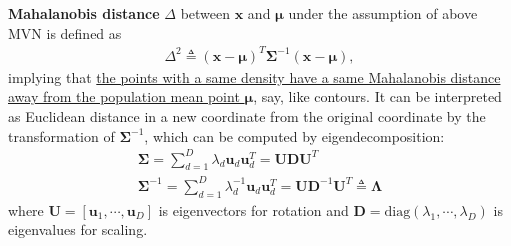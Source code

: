 \textbf{Mahalanobis distance} $\Delta$ between $\bm{x}$ and $\bm{\mu}$
under the assumption of above MVN is defined as
\begin{gather}
    \Delta^2\triangleq
    (\bm{x}-\bm{\mu})^T
    \bm{\Sigma}^{-1}
    (\bm{x}-\bm{\mu}),
\end{gather}
implying that \uline{the points with a same density have a same Mahalanobis distance 
away from the population mean point $\bm{\mu}$}, say, like contours.
It can be interpreted as Euclidean distance in a new coordinate 
from the original coordinate by the transformation of 
$\bm{\Sigma}^{-1}$,
which can be computed by eigendecomposition:
\begin{gather}
    \bm{\Sigma}
    = \sum_{d=1}^D{\lambda_d\bm{u}_d\bm{u}_d^T}
    = \bm{U}\bm{D}\bm{U}^T\\
    \bm{\Sigma}^{-1}
    = \sum_{d=1}^D{\lambda_d^{-1}\bm{u}_d\bm{u}_d^T}
    = \bm{U}\bm{D}^{-1}\bm{U}^T
    \triangleq \bm{\Lambda}
\end{gather}
where $\bm{U}=[\bm{u}_1,\cdots,\bm{u}_D]$ is eigenvectors for rotation and 
$\bm{D}=\mathrm{diag}(\lambda_1,\cdots,\lambda_D)$ is eigenvalues for scaling.


